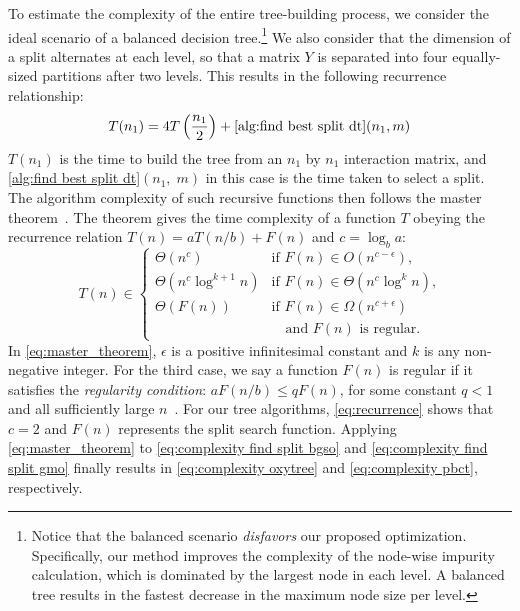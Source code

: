 \begin{appendices}
To estimate the complexity of the entire tree-building process, we consider the ideal scenario of a balanced decision tree.\footnote{Notice that the balanced scenario \emph{disfavors} our proposed optimization. Specifically, our method improves the complexity of the node-wise impurity calculation, which is dominated by the largest node in each level. A balanced tree results in the fastest decrease in the maximum node size per level.}
We also consider that the dimension of a split alternates at each level, so that a matrix $Y$ is separated into four equally-sized partitions after two levels. This results in the following recurrence relationship:
%
\begin{equation}
    T(n_1) = 4T\left(\frac{n_1}{2}\right) + \text{\ref{alg:find best split dt}}(n_1, m)
    \label{eq:recurrence}
\end{equation}
%
$T(n_1)$ is the time to build the tree from an $n_1$ by $n_1$ interaction matrix, and \ref{alg:find best split dt}$(n_1,\; m)$ in this case is the time taken to select a split.
The algorithm complexity of such recursive functions then follows the master theorem~\cite{cormen_introduction_2022}. The theorem gives the time complexity of a function $T$ obeying the recurrence relation $T(n) = aT(n/b) + F(n)$ and $c=\log_b a$:
%
\begin{equation}
    T(n) \in \begin{cases}
        \Theta(n^c) & \text{if } F(n) \in O(n^{c-\epsilon})\text{,} \\
        \Theta(n^c \log^{k+1} n) & \text{if } F(n) \in \Theta(n^c \log^k n)\text{,}\\
        \Theta(F(n)) & \text{if } F(n) \in \Omega(n^{c+\epsilon})
            \\&\quad\text{and }F(n)\text{ is regular.}
    \end{cases}
    \label{eq:master_theorem}
\end{equation}
%
In \cref{eq:master_theorem}, $\epsilon$ is a positive infinitesimal constant and $k$ is any non-negative integer. For the third case, we say a function $F(n)$ is regular if it satisfies the \emph{regularity condition}: $aF(n/b) \leq qF(n)$, for some constant $q < 1$ and all sufficiently large $n$~\cite{cormen_introduction_2022}.
% 
For our tree algorithms, \cref{eq:recurrence} shows that $c=2$ and $F(n)$ represents the split search function.
Applying \cref{eq:master_theorem} to \cref{eq:complexity find split bgso} and \cref{eq:complexity find split gmo} finally results in \cref{eq:complexity oxytree} and \cref{eq:complexity pbct}, respectively.



\end{appendices}
